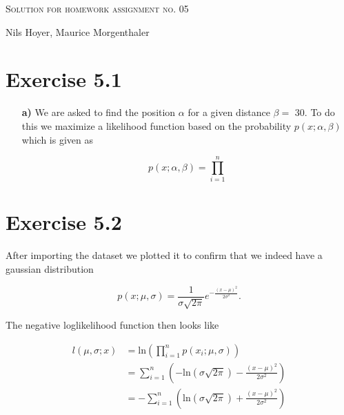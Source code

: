 \documentclass[10pt]{article}
\newenvironment{myfont}{\fontfamily{put}\selectfont}{\par}
\begin{document}
\begin{myfont}

\begin{center}
  \begin{Large}
    \textsc{Solution for homework assignment no. 05} \\
  \end{Large}
	\vspace*{0.4cm}
    Nils Hoyer, Maurice Morgenthaler
  \vspace*{1cm}
\end{center}

\section*{Exercise 5.1}

\begin{itemize}
  \item[\textbf{a)}] We are asked to find the position $\alpha$ for a given distance $\beta =$ \num{30}.
  To do this we maximize a likelihood function based on the probability $p(x;\alpha, \beta)$ which is given as

  \begin{equation}
    p(x; \alpha, \beta) = \prod_{i = 1}^{n} 
  \end{equation}
\end{itemize}



\section*{Exercise 5.2}

After importing the dataset we plotted it to confirm that we indeed have a gaussian distribution

\begin{equation}
p(x;\mu, \sigma) = \frac{1}{\sigma\sqrt{2\pi}} e^{-\frac{\left(x - \mu\right)^{2}}{2\sigma^{2}}}.
\end{equation}

\noindent The negative loglikelihood function then looks like

\begin{align*}
l(\mu, \sigma; x) & = \textrm{ln}\left(\prod_{i = 1}^{n}p(x_{i}; \mu, \sigma)\right) \\
                  & = \sum_{i = 1}^{n} \left(-\textrm{ln}\left(\sigma\sqrt{2\pi}\right) - \frac{\left(x - \mu\right)^{2}}{2\sigma^{2}}\right) \\
                  & = - \sum_{i = 1}^{n} \left(\textrm{ln}\left(\sigma\sqrt{2\pi}\right) + \frac{\left(x - \mu\right)^{2}}{2\sigma^{2}}\right)
\end{align*}


\end{myfont}
\end{document}
